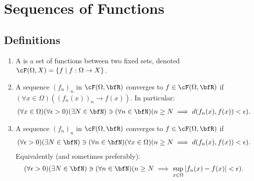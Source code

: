 \chapter*{Sequences of Functions}

\section*{Definitions}
    \begin{enumerate}[label = (\arabic*)]
        \item A  is a set of functions between two fixed sets, denoted $\cF(\Omega, X) = \{f \mid f:\Omega \rightarrow X\}$.
        
        \item A sequence $(f_n)_n$ in $\cF(\Omega, \bfR)$ converges  to $f \in \cF(\Omega, \bfR)$ if $(\forall x \in \Omega)((f_n(x))_n \rightarrow f(x))$. In particular:
            \begin{equation*}
            \begin{split}
                (\forall x \in \Omega)(\forall \epsilon > 0)(\exists N \in \bfN) \ni (\forall n \in \bfN)(n \geq N \implies d(f_n(x),f(x)) < \epsilon).
            \end{split}
            \end{equation*}
        
        \item A sequence $(f_n)_n$ in $\cF(\Omega, \bfR)$ converges  to $f \in \cF(\Omega, \bfR)$ if 
            \begin{equation*}
            \begin{split}
                (\forall \epsilon > 0)(\exists N \in \bfN) \ni (\forall n \in \bfN)(\forall x \in \Omega)(n \geq N \implies d(f_n(x),f(x)) < \epsilon).
            \end{split}
            \end{equation*}
        Equivalently (and sometimes preferably):
            \begin{equation*}
            \begin{split}
                (\forall \epsilon > 0)(\exists N \in \bfN) \ni (\forall n \in \bfN)(n \geq N \implies \sup_{x \in \Omega}|f_n(x) - f(x)| < \epsilon).
            \end{split}
            \end{equation*}
    \end{enumerate}
